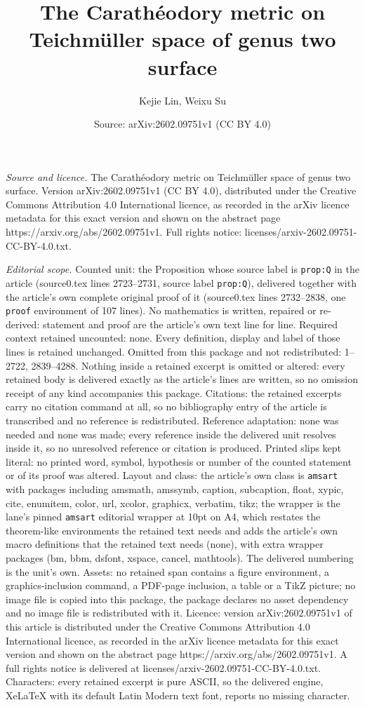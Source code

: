 \documentclass[10pt,a4paper]{amsart}
\title[The Carath\'eodory metric on Teichm\"uller space of genus tw]{The Carath\'eodory metric on Teichm\"uller space of genus two surface}
\author{Kejie Lin, Weixu Su}
\date{Source: arXiv:2602.09751v1 (CC BY 4.0)}
\begin{document}
\maketitle

\noindent\emph{Source and licence.} The Carath\'eodory metric on Teichm\"uller space of genus two surface. Version arXiv:2602.09751v1 (CC BY 4.0), distributed under the Creative Commons Attribution 4.0 International licence, as recorded in the arXiv licence metadata for this exact version and shown on the abstract page https://arxiv.org/abs/2602.09751v1. Full rights notice: licenses/arxiv-2602.09751-CC-BY-4.0.txt.\par\smallskip

\noindent\textit{Editorial scope.} Counted unit: the Proposition whose source label is \texttt{prop:Q} in the article (source0.tex lines 2723--2731, source label \texttt{prop:Q}), delivered together with the article's own complete original proof of it (source0.tex lines 2732--2838, one \texttt{proof} environment of 107 lines). No mathematics is written, repaired or re-derived: statement and proof are the article's own text line for line. Required context retained uncounted: none. Every definition, display and label of those lines is retained unchanged. Omitted from this package and not redistributed: 1--2722, 2839--4288. Nothing inside a retained excerpt is omitted or altered: every retained body is delivered exactly as the article's lines are written, so no omission receipt of any kind accompanies this package. Citations: the retained excerpts carry no citation command at all, so no bibliography entry of the article is transcribed and no reference is redistributed. Reference adaptation: none was needed and none was made; every reference inside the delivered unit resolves inside it, so no unresolved reference or citation is produced. Printed slips kept literal: no printed word, symbol, hypothesis or number of the counted statement or of its proof was altered. Layout and class: the article's own class is \texttt{amsart} with packages including amsmath, amssymb, caption, subcaption, float, xypic, cite, enumitem, color, url, xcolor, graphicx, verbatim, tikz; the wrapper is the lane's pinned \texttt{amsart} editorial wrapper at 10pt on A4, which restates the theorem-like environments the retained text needs and adds the article's own macro definitions that the retained text needs (none), with extra wrapper packages (bm, bbm, dsfont, xspace, cancel, mathtools). The delivered numbering is the unit's own. Assets: no retained span contains a figure environment, a graphics-inclusion command, a PDF-page inclusion, a table or a TikZ picture; no image file is copied into this package, the package declares no asset dependency and no image file is redistributed with it. Licence: version arXiv:2602.09751v1 of this article is distributed under the Creative Commons Attribution 4.0 International licence, as recorded in the arXiv licence metadata for this exact version and shown on the abstract page https://arxiv.org/abs/2602.09751v1. A full rights notice is delivered at licenses/arxiv-2602.09751-CC-BY-4.0.txt. Characters: every retained excerpt is pure ASCII, so the delivered engine, XeLaTeX with its default Latin Modern text font, reports no missing character.
\end{document}
